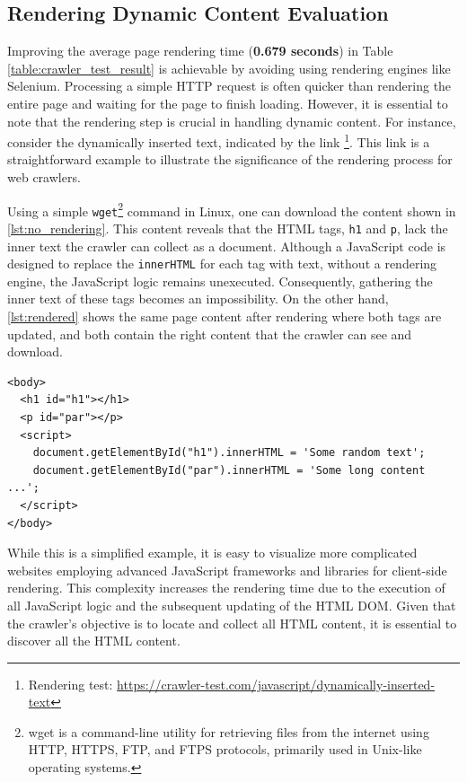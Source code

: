 {\subsection*{Rendering Dynamic Content Evaluation}
Improving the average page rendering time (\textbf{0.679 seconds}) in Table \ref{table:crawler_test_result} is achievable by avoiding using rendering engines like Selenium. Processing a simple HTTP request is often quicker than rendering the entire page and waiting for the page to finish loading. However, it is essential to note that the rendering step is crucial in handling dynamic content. For instance, consider the dynamically inserted text, indicated by the link \footnote{Rendering test: \url{https://crawler-test.com/javascript/dynamically-inserted-text}}. This link is a straightforward example to illustrate the significance of the rendering process for web crawlers.

Using a simple \texttt{wget}\footnote{wget is a command-line utility for retrieving files from the internet using HTTP, HTTPS, FTP, and FTPS protocols, primarily used in Unix-like operating systems.} command in Linux, one can download the content shown in \ref{lst:no_rendering}. This content reveals that the HTML tags, \texttt{h1} and \texttt{p}, lack the inner text the crawler can collect as a document. Although a JavaScript code is designed to replace the \texttt{innerHTML} for each tag with text, without a rendering engine, the JavaScript logic remains unexecuted. Consequently, gathering the inner text of these tags becomes an impossibility. On the other hand, \ref{lst:rendered} shows the same page content after rendering where both tags are updated, and both contain the right content that the crawler can see and download.

\lstset{language=HTML}
{\footnotesize
\begin{lstlisting}[frame=single, caption={The dynamically-inserted-text link content before rendering},captionpos=b, label={lst:no_rendering.}]
<body>
  <h1 id="h1"></h1> 
  <p id="par"></p>
  <script>
    document.getElementById("h1").innerHTML = 'Some random text';
    document.getElementById("par").innerHTML = 'Some long content ...'; 
  </script>
</body>
\end{lstlisting}}


While this is a simplified example, it is easy to visualize more complicated websites employing advanced JavaScript frameworks and libraries for client-side rendering. This complexity increases the rendering time due to the execution of all JavaScript logic and the subsequent updating of the HTML DOM. Given that the crawler's objective is to locate and collect all HTML content, it is essential to discover all the HTML content. 


}
